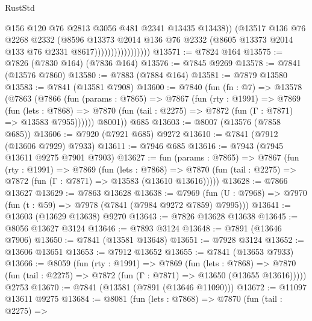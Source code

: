 \begin{lexlean}{RustStd}
\begin{coremodule}
{\begin{coremodule}
{{{{{{{{{{{{{{{{{{{{{{{{{{{{{{{{{{{{{{{{{{{{{{{{{{{{{{                                    @156
                                    @120
                                    @76
                                    @2813
                                    @3056
                                    @481
                                    @2341
                                    @13435
                                    @13438))
                                (@13517
                                  @136
                                  @76
                                  @2268
                                  @2332
                                  (@8596
                                    @13373
                                    @2014
                                    @136
                                    @76
                                    @2332
                                    (@8605 @13373 @2014 @133 @76 @2331 @8617)))))))))))))))))
@13571 := @7824 @164
@13575 := @7826 (@7830 @164) (@7836 @164)
@13576 := @7845 @9269
@13578 := @7841 (@13576 @7860)
@13580 := @7883 (@7884 @164)
@13581 := @7879 @13580
@13583 := @7841 (@13581 @7908)
@13600 := @7840
    (fun (fn : @7) =>
    @13578
      (@7863
        (@7866
          (fun (params : @7865) =>
          @7867
            (fun (rty : @1991) =>
            @7869
              (fun (lets : @7868) =>
              @7870 (fun (tail : @2275) => @7872 (fun (Γ : @7871) => @13583 @7955))))))
        @8001))
    @685
@13603 := @8007 (@13576 (@7858 @685))
@13606 := @7920 (@7921 @685) @9272
@13610 := @7841 (@7912 (@13606 @7929) @7933)
@13611 := @7946 @685
@13616 := @7943 (@7945 @13611 @9275 @7901 @7903)
@13627 := fun (params : @7865) =>
  @7867
    (fun (rty : @1991) =>
    @7869
      (fun (lets : @7868) =>
      @7870 (fun (tail : @2275) => @7872 (fun (Γ : @7871) => @13583 (@13610 @13616)))))
@13628 := @7866 @13627
@13629 := @7863 @13628
@13638 := @7969
    (fun (U : @7968) => @7970 (fun (t : @59) => @7978 (@7841 (@7984 @9272 @7859) @7995)))
@13641 := @13603 (@13629 @13638) @9270
@13643 := @7826 @13628 @13638
@13645 := @8056 @13627 @3124
@13646 := @7893 @3124
@13648 := @7891 (@13646 @7906)
@13650 := @7841 (@13581 @13648)
@13651 := @7928 @3124
@13652 := @13606 @13651
@13653 := @7912 @13652
@13655 := @7841 (@13653 @7933)
@13666 := @8059
    (fun (rty : @1991) =>
    @7869
      (fun (lets : @7868) =>
      @7870 (fun (tail : @2275) => @7872 (fun (Γ : @7871) => @13650 (@13655 @13616)))))
    @2753
@13670 := @7841 (@13581 (@7891 (@13646 @11090)))
@13672 := @11097 @13611 @9275
@13684 := @8081
    (fun (lets : @7868) =>
    @7870
      (fun (tail : @2275) =>
}}}}}}}}}}}}}}}}}}}}}}}}}}}}}}}}}}}}}}}}}}}}}}}}}}}}}}
\end{coremodule}}
\end{coremodule}
\end{lexlean}
